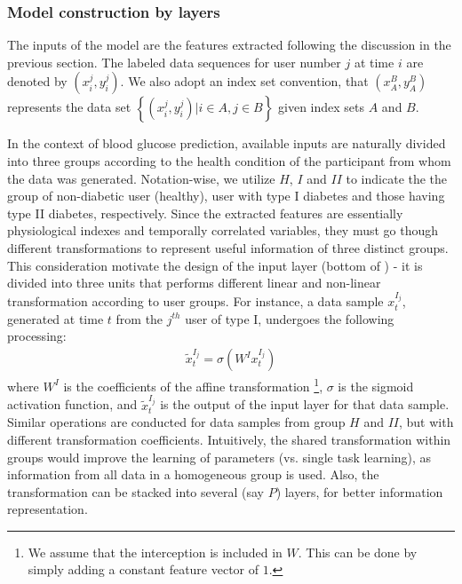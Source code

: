 \subsubsection{Model construction by layers}
The inputs of the \modelname model are the features extracted following the discussion in the previous section.
The labeled data sequences for user number $j$ at time $i$ are denoted by $(x_i^{j},y_i^{j})$.
We also adopt an index set convention, that $(x_A^{B},y_A^B)$ represents the data set $\left\{(x_i^{j},y_i^{j}) | i \in A, j\in B\right\}$ given index sets $A$ and $B$.

In the context of blood glucose prediction, available inputs are naturally divided into three groups according to the health condition of the participant from whom the data was generated.
Notation-wise, we utilize $H$, $I$ and $II$ to indicate the the group of non-diabetic user (healthy), user with type I diabetes and those having type II diabetes, respectively.
Since the extracted features are essentially physiological indexes and temporally correlated variables, they must go though different transformations to represent useful information of three distinct groups.
This consideration motivate the design of the input layer (bottom of ) - it is divided into three units that performs different linear and non-linear transformation according to user groups.
For instance, a data sample $x_t^{I_j}$, generated at time $t$ from the $j^{th}$ user of type I, undergoes the following processing:
\begin{align}
\tilde{x}_t^{I_j} = \sigma \left( W^Ix_t^{I_j} \right)
\end{align}
where $W^I$ is the coefficients of the affine transformation \footnote{We assume that the interception is included in $W$. This can be done by simply adding a constant feature vector of $1$.}, $\sigma$ is the sigmoid activation function, and $\tilde{x}_t^{I_j}$ is the output of the input layer for that data sample.
Similar operations are conducted for data samples from group $H$ and $II$, but with different transformation coefficients.
Intuitively, the shared transformation within groups would improve the learning of parameters (vs. single task learning), as information from all data in a homogeneous group is used.
Also, the transformation can be stacked into several (say $P$) layers, for better information representation.

